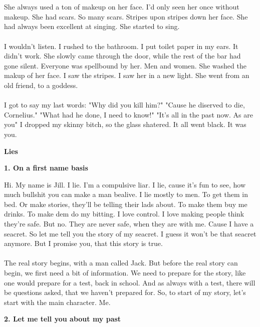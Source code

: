 \documentclass[]{article}
\begin{document}
\\ \\
She always used a ton of makeup on her face. I'd only seen her once without makeup. She had scars. So many scars. Stripes upon stripes down her face. She had always been excellent at singing. She started to sing.
\\ \\
I wouldn't listen. I rushed to the bathroom. I put toilet paper in my ears. It didn't work. She slowly came through the door, while the rest of the bar had gone silent. Everyone was spellbound by her. Men and women. She washed the makup of her face. I saw the stripes. I saw her in a new light. She went from an old friend, to a goddess. 
\\ \\
I got to say my last words: "Why did you kill him?" "Cause he diserved to die, Cornelius." "What had he done, I need to know!" "It's all in the past now. As are you" I dropped my skinny bitch, so the glass shatered. It all went black. It was you.

\newpage

\begin{center}
	\Large\textbf{Lies}
\end{center}

\begin{center}
	\large\textbf{1. On a first name basis}
\end{center}

Hi. My name is Jill. I lie. I'm a compulsive liar. I lie, cause it's fun to see, how much bullshit you can make a man bealive. I lie mostly to men. To get them in bed. Or make stories, they'll be telling their lads about. To make them buy me drinks. To make dem do my bitting. I love control. I love making people think they're safe. But no. They are never safe, when they are with me. Cause I have a seacret. So let me tell you the story of my seacret. I guess it won't be that seacret anymore. But I promise you, that this story is true.
\\ \\
The real story begins, with a man called Jack. But before the real story can begin, we first need a bit of information. We need to prepare for the story, like one would prepare for a test, back in school. And as always with a test, there will be questions asked, that we haven't prepared for. So, to start of my story, let's start with the main character. Me.

\begin{center}
	\large\textbf{2. Let me tell you about my past}
\end{center}
\end{document}
